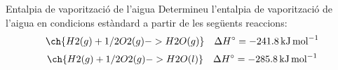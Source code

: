 \begin{exr}{Entalpia de vaporització de l'aigua}
    Determineu l'entalpia de vaporització de l'aigua en condicions estàndard a partir de les següents reaccions:
\[
\ch{H2(g) + 1/2 O2(g) -> H2O(g)} \quad \Delta H^\circ = \qty{-241.8}{\kilo\joule\per\mol}
\]
\[
\ch{H2(g) + 1/2 O2(g) -> H2O(l)} \quad \Delta H^\circ = \qty{-285.8}{\kilo\joule\per\mol}
\]
\end{exr}
